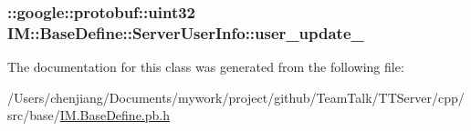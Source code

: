 \subsubsection[{user\+\_\+update\+\_\+}]{\setlength{\rightskip}{0pt plus 5cm}\+::google\+::protobuf\+::uint32 I\+M\+::\+Base\+Define\+::\+Server\+User\+Info\+::user\+\_\+update\+\_\+\hspace{0.3cm}{\ttfamily [private]}}\label{class_i_m_1_1_base_define_1_1_server_user_info_aa8096b53af51716884bec0a17945280d}


The documentation for this class was generated from the following file\+:\begin{DoxyCompactItemize}
\item 
/\+Users/chenjiang/\+Documents/mywork/project/github/\+Team\+Talk/\+T\+T\+Server/cpp/src/base/\hyperlink{_i_m_8_base_define_8pb_8h}{I\+M.\+Base\+Define.\+pb.\+h}\end{DoxyCompactItemize}
